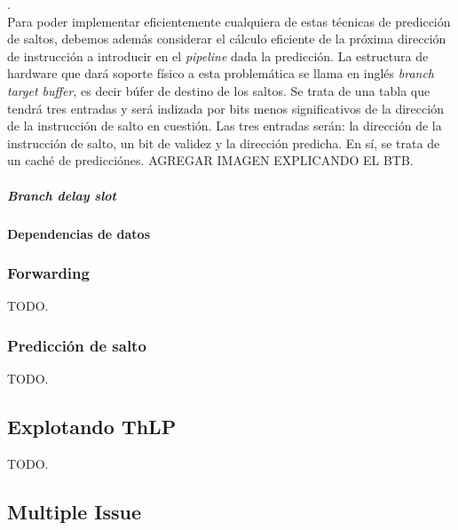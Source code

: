 \cite[sección, 3.3]{caaqa}.\\
Para poder implementar eficientemente cualquiera de estas técnicas de 
predicción de saltos, debemos además considerar el cálculo eficiente de la 
próxima dirección de instrucción a introducir en el \emph{pipeline} dada la 
predicción. La estructura de hardware que dará soporte físico a esta 
problemática se llama en inglés \emph{branch target buffer}, es decir búfer de 
destino de los saltos. Se trata de una tabla que tendrá tres entradas y será 
indizada por bits menos significativos de la dirección de la instrucción de 
salto en cuestión. Las tres entradas serán: la dirección de la instrucción de 
salto, un bit de validez y la dirección predicha. En sí, se trata de un caché 
de predicciónes. AGREGAR IMAGEN EXPLICANDO EL BTB.

\subparagraph{Branch delay slot}

\paragraph{Dependencias de datos}
\label{par:optimizations-ilp-pipeline-data_dependencies}


\subsubsection{Forwarding}
\label{subsubsec:optimizations-ilp-forwarding}

TODO.

\subsubsection{Predicción de salto}
\label{subsubsec:optimizations-ilp-branch_prediction}

TODO.

\subsection{Explotando ThLP}
\label{subsec:optimizations-thlp}

TODO.











\subsection{Multiple Issue}
\label{subsec:optimizations-multiple_issue}

